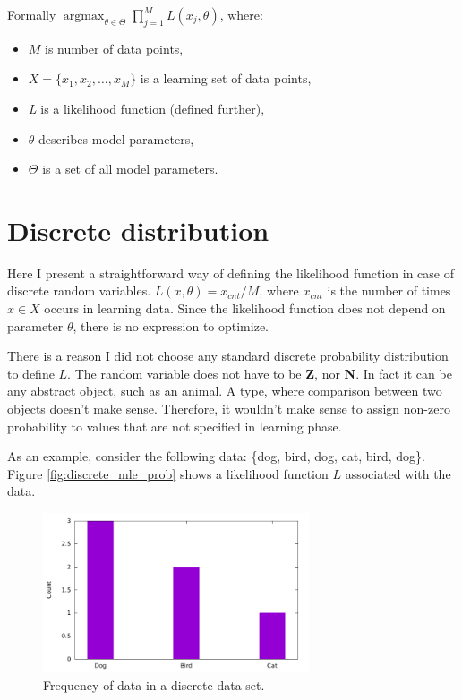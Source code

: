 \documentclass[thesis=B,english]{FITthesis}[2012/06/26]
\DeclareMathOperator*{\argmax}{argmax} %
\begin{document}
Formally $\argmax_{\theta \in \Theta} \prod_{j=1}^{M} L(x_j, \theta)$, where:

\begin{itemize}

\item $M$ is number of data points,
\item $X = \{x_1, x_2, \dots, x_M\}$ is a learning set of data points,
\item \emph{L} is a likelihood function (defined further),
\item $\theta$ describes model parameters,
\item $\Theta$ is a set of all model parameters.

\end{itemize}

\section{Discrete distribution}

Here I present a straightforward way of defining the likelihood function in case of discrete random variables. $L(x,\theta) = x_{cnt} / M$, where $x_{cnt}$ is the number of times $x \in X$ occurs in learning data. Since the likelihood function does not depend on parameter $\theta$, there is no expression to optimize.

There is a reason I did not choose any standard discrete probability distribution to define $L$. The random variable does not have to be \textbf Z, nor \textbf N. In fact it can be any abstract object, such as an animal. A type, where comparison between two objects doesn't make sense. Therefore, it wouldn't make sense to assign non-zero probability to values that are not specified in learning phase.

As an example, consider the following data: \{dog, bird, dog, cat, bird, dog\}. Figure \ref{fig:discrete_mle_prob} shows a likelihood function $L$ associated with the data.

\begin{figure}
	\centering
 	\includegraphics[width=0.7\textwidth]{discrete_mle_hist}
 	\caption{Frequency of data in a discrete data set.}
 	\label{fig:discrete_mle_hist}
\end{figure}
\end{document}
